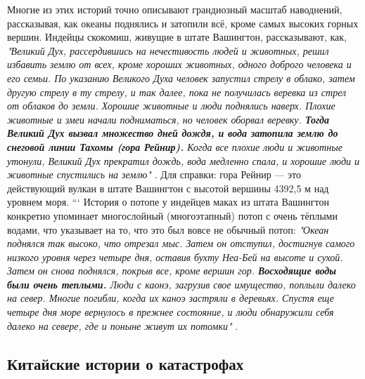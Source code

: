 \documentclass[10pt,twocolumn,letterpaper]{article}
\begin{document}
Многие из этих историй точно описывают грандиозный масштаб наводнений, рассказывая, как океаны поднялись и затопили всё, кроме самых высоких горных вершин. Индейцы скокомиш, живущие в штате Вашингтон, рассказывают, как, \textit{"Великий Дух, рассердившись на нечестивость людей и животных, решил избавить землю от всех, кроме хороших животных, одного доброго человека и его семьи. По указанию Великого Духа человек запустил стрелу в облако, затем другую стрелу в ту стрелу, и так далее, пока не получилась веревка из стрел от облаков до земли. Хорошие животные и люди поднялись наверх. Плохие животные и змеи начали подниматься, но человек оборвал веревку. \textbf{Тогда Великий Дух вызвал множество дней дождя, и вода затопила землю до снеговой линии Тахомы (гора Рейнир).} Когда все плохие люди и животные утонули, Великий Дух прекратил дождь, вода медленно спала, и хорошие люди и животные спустились на землю"} \cite{3}. Для справки: гора Рейнир — это действующий вулкан в штате Вашингтон с высотой вершины 4392,5 м над уровнем моря.
```
История о потопе у индейцев маках из штата Вашингтон конкретно упоминает многослойный (многоэтапный) потоп с очень тёплыми водами, что указывает на то, что это был вовсе не обычный потоп: \textit{"Океан поднялся так высоко, что отрезал мыс. Затем он отступил, достигнув самого низкого уровня через четыре дня, оставив бухту Неа-Бей на высоте и сухой. Затем он снова поднялся, покрыв все, кроме вершин гор. \textbf{Восходящие воды были очень теплыми.} Люди с каонэ, загрузив свое имущество, поплыли далеко на север. Многие погибли, когда их каноэ застряли в деревьях. Спустя еще четыре дня море вернулось в прежнее состояние, и люди обнаружили себя далеко на севере, где и поныне живут их потомки"} \cite{3}.

\subsection{Китайские истории о катастрофах}
\end{document}
